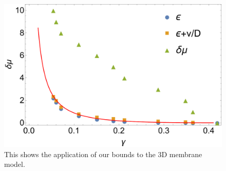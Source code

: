 \documentclass[amsmath,preprintnumbers,10pt,nofootinbib,prl,twocolumn]{revtex4-1}
\begin{document}
\begin{figure}
\includegraphics[width=1\linewidth,angle=0]{boundsfor3Dmembrane.pdf}
\caption{ This shows the application of our bounds to the 3D membrane model.}
\label{fig:boundsof3Dmembrane}
\end{figure}

\end{document}
